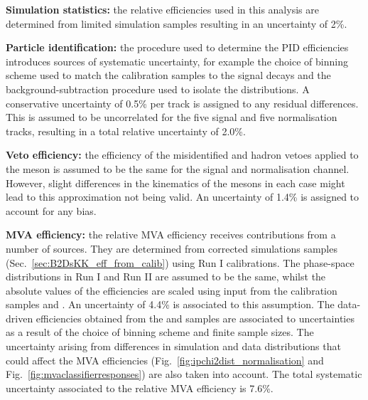 \begin{description}
\item \textbf{Simulation statistics:} the relative efficiencies used in this analysis are determined from limited simulation samples resulting in an uncertainty of 2\%. 

\item \textbf{Particle identification:} the procedure used to determine the PID efficiencies introduces sources of systematic uncertainty, for example the choice of binning scheme used to match the calibration samples to the signal decays and the background-subtraction procedure used to isolate the distributions. 
A conservative uncertainty of 0.5\% per track is assigned to any residual differences. This is assumed to be uncorrelated for the five signal and five normalisation tracks, resulting in a total relative uncertainty of 2.0\%.

\item \textbf{Veto efficiency:} the efficiency of the misidentified \Dp and \Lc hadron vetoes applied to the \Dsp meson is assumed to be the same for the signal and normalisation channel. However, slight differences in the kinematics of the \Dsp mesons in each case might lead to this approximation not being valid. An uncertainty of 1.4\% is assigned to account for any bias.

\item \textbf{MVA efficiency:} the relative MVA efficiency receives contributions from a number of sources.
They are determined from corrected simulations samples (Sec.~\ref{sec:B2DsKK_eff_from_calib}) using Run I calibrations. The phase-space distributions in Run I and Run II are assumed to be the same, whilst the absolute values of the efficiencies are scaled using input from the calibration samples \decay{\Bs}{\jpsi\phiz} and \decay{\Bsb}{\Dsp\pim}. An uncertainty of 4.4\% is associated to this assumption. 
The data-driven efficiencies obtained from the \decay{\Bs}{\jpsi\phiz} and \decay{\Bsb}{\Dsp\pim} samples are associated to uncertainties as a result of the choice of binning scheme and finite sample sizes. 
The uncertainty arising from differences in simulation and data distributions that could affect the MVA efficiencies (Fig.~\ref{fig:ipchi2dist_normalisation} and Fig.~\ref{fig:mvaclassifierresponses}) are also taken into account.
The total systematic uncertainty associated to the relative MVA efficiency is 7.6\%. 



\end{description}
